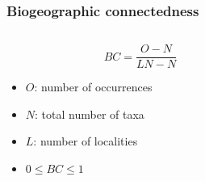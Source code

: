 \documentclass{beamer} \usepackage{amsmath,amsthm}
\begin{document}
\begin{frame}
  \frametitle{Biogeographic connectedness}

  \begin{columns}
    \begin{column}{0.5\textwidth}
      \[
        BC = \frac{O - N}{LN - N}
      \]

      \begin{itemize}
        \item \(O\): number of occurrences
        \item \(N\): total number of taxa
        \item \(L\): number of localities
        \item \(0 \leq BC \leq 1\)
      \end{itemize}
    \end{column}
    \begin{column}{0.5\textwidth}
      \begin{center}

\end{center}
\end{column}
\end{columns}
\end{frame}
\end{document}
